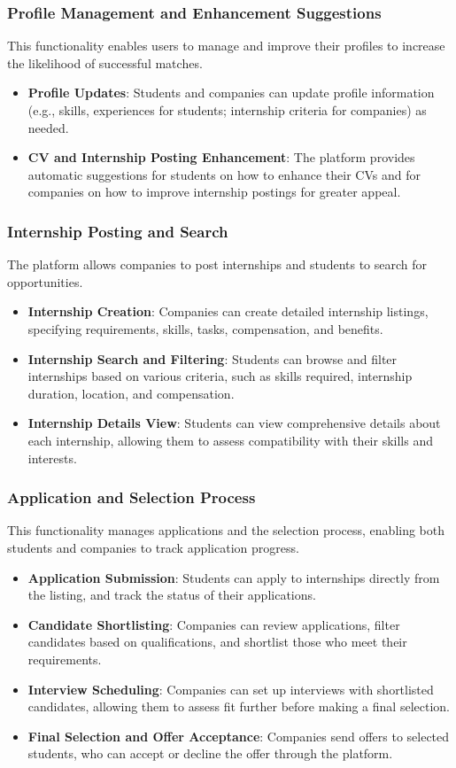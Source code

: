 \subsubsection*{Profile Management and Enhancement Suggestions} 
This functionality enables users to manage and improve their profiles to increase the likelihood of successful matches.
\begin{itemize}
    \item \textbf{Profile Updates}: Students and companies can update profile information (e.g., skills, experiences for students; internship criteria for companies) as needed.
    \item \textbf{CV and Internship Posting Enhancement}: The platform provides automatic suggestions for students on how to enhance their CVs and for companies on how to improve internship postings for greater appeal.
\end{itemize}

\subsubsection*{Internship Posting and Search} 
The platform allows companies to post internships and students to search for opportunities.
\begin{itemize}
    \item \textbf{Internship Creation}: Companies can create detailed internship listings, specifying requirements, skills, tasks, compensation, and benefits.
    \item \textbf{Internship Search and Filtering}: Students can browse and filter internships based on various criteria, such as skills required, internship duration, location, and compensation.
    \item \textbf{Internship Details View}: Students can view comprehensive details about each internship, allowing them to assess compatibility with their skills and interests.
\end{itemize}

\subsubsection*{Application and Selection Process} 
This functionality manages applications and the selection process, enabling both students and companies to track application progress.
\begin{itemize}
    \item \textbf{Application Submission}: Students can apply to internships directly from the listing, and track the status of their applications.
    \item \textbf{Candidate Shortlisting}: Companies can review applications, filter candidates based on qualifications, and shortlist those who meet their requirements.
    \item \textbf{Interview Scheduling}: Companies can set up interviews with shortlisted candidates, allowing them to assess fit further before making a final selection.
    \item \textbf{Final Selection and Offer Acceptance}: Companies send offers to selected students, who can accept or decline the offer through the platform.
\end{itemize}

